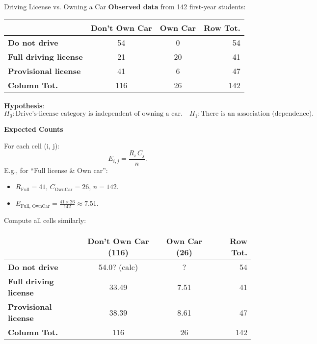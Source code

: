 \documentclass[10pt, total={6in, 8in}]{extarticle}
\begin{document}
\begin{examplebox}{Driving License vs. Owning a Car}{}
    \small
    \textbf{Observed data} from 142 first-year students:

    \begin{center}
        \begin{tabular}{lccr}
            \toprule
                                          & Don't Own Car & Own Car & Row Tot. \\
            \midrule
            \textbf{Do not drive}         & 54            & 0       & 54       \\
            \textbf{Full driving license} & 21            & 20      & 41       \\
            \textbf{Provisional license}  & 41            & 6       & 47       \\
            \midrule
            \textbf{Column Tot.}          & 116           & 26      & 142      \\
            \bottomrule
        \end{tabular}
    \end{center}

    \textbf{Hypothesis}:
    \[
        H_0:
        \text{Drive's-license category is independent of owning a car.}
        \quad
        H_1:
        \text{There is an association (dependence).}
    \]

    \textbf{Expected Counts}

    For each cell (i, j):
    \[
        E_{i,j}
        = \frac{R_i \, C_j}{n}.
    \]
    E.g., for “Full license \& Own car”:
    \begin{itemize}
        \item $R_{\text{Full}} = 41$, $C_{\text{OwnCar}} = 26$, $n=142$.
        \item $E_{\text{Full, OwnCar}} = \frac{41\times 26}{142}\approx 7.51.$
    \end{itemize}

    Compute all cells similarly:

    \begin{center}
        \begin{tabular}{lccr}
            \toprule
                                          & Don't Own Car (116) & Own Car (26) & Row Tot. \\
            \midrule
            \textbf{Do not drive}         & 54.0? (calc)        & ?            & 54       \\
            \textbf{Full driving license} & 33.49               & 7.51         & 41       \\
            \textbf{Provisional license}  & 38.39               & 8.61         & 47       \\
            \midrule
            \textbf{Column Tot.}          & 116                 & 26           & 142      \\
            \bottomrule
        \end{tabular}
    \end{center}


\end{examplebox}
\end{document}
